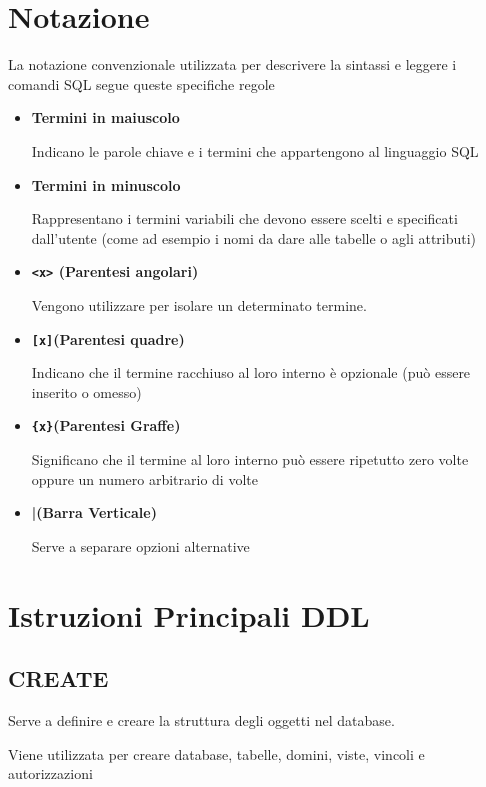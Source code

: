 \section{Notazione}
La notazione convenzionale utilizzata per descrivere la sintassi e leggere i comandi SQL segue queste specifiche regole

\begin{itemize}
    \item \textbf{Termini in maiuscolo}

    Indicano le parole chiave e i termini che appartengono al linguaggio SQL

    \item \textbf{Termini in minuscolo}

    Rappresentano i termini variabili che devono essere scelti e specificati dall'utente (come ad esempio i nomi da dare alle tabelle o agli attributi)

    \item \textbf{\texttt{<x>}  (Parentesi angolari)}

    Vengono utilizzare per isolare un determinato termine.

    \item \textbf{\texttt{[x]}(Parentesi quadre)}

    Indicano che il termine racchiuso al loro interno è opzionale (può essere inserito o omesso)

    \item  \textbf{\texttt{\{x\}}(Parentesi Graffe)}

    Significano che il termine al loro interno può essere ripetutto zero volte oppure un numero arbitrario di volte

    \item \textbf{|(Barra Verticale)}

    Serve a separare opzioni alternative
\end{itemize}
\section{Istruzioni Principali DDL}
\subsection{CREATE}

Serve a definire e creare la struttura degli oggetti nel database.

Viene utilizzata per creare database, tabelle, domini, viste, vincoli e autorizzazioni

